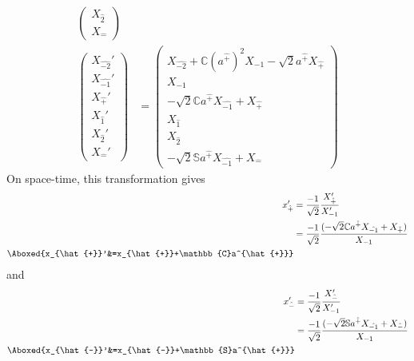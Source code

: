 \documentclass[]{article}
\numberwithin{equation}{section}
\begin{document}
{{\begin{align}
\begin{pmatrix}
    {X}_{\hat{2}}\\
    {X}_{\hat{-}}
    \end{pmatrix}\\
    \begin{pmatrix}
    {X}_{\hat{-2}}'\\
    {X}_{\hat{-1}}'\\
    {X}_{\hat{+}}'\\
    {X}_{\hat{1}}'\\
    {X}_{\hat{2}}'\\
    {X}_{\hat{-}}'
    \end{pmatrix}&= \begin{pmatrix}
    {X}_{\hat{-2}}+\mathbb{C}(a^{\hat{+}})^2{X}_{-1}-\sqrt{2}a^{\hat{+}}{X}_{\hat{+}}\\
    {X}_{-1}\\
    -\sqrt{2}\mathbb{C}a^{\hat{+}}{X}_{\hat{-1}}+{X}_{\hat{+}}\\
    {X}_{\hat{1}}\\
    {X}_{\hat{2}}\\
    -\sqrt{2}\mathbb{S}a^{\hat{+}}{X}_{\hat{-1}}+{X}_{\hat{-}}
    \end{pmatrix}
\end{align}
On space-time, this transformation gives
\begin{align}
    x_{\hat{+}}'&=\frac{-1}{\sqrt{2}}\frac{{X}_{{\hat{+}}}'}{ {X}_{-1}'}\\
    &=\frac{-1}{\sqrt{2}}\frac{(-\sqrt{2}\mathbb{C}a^{\hat{+}}{X}_{\hat{-1}}+{X}_{\hat{+}})}{{X}_{-1}}\\
    \Aboxed{x_{\hat{+}}'&=x_{\hat{+}}+\mathbb{C}a^{\hat{+}}}
\end{align}
and
\begin{align}
    x_{\hat{-}}'&=\frac{-1}{\sqrt{2}}\frac{{X}_{{\hat{-}}}'}{ {X}_{-1}'}\\
    &=\frac{-1}{\sqrt{2}}\frac{(-\sqrt{2}\mathbb{S}a^{\hat{+}}{X}_{\hat{-1}}+{X}_{\hat{-}})}{{X}_{-1}}\\
    \Aboxed{x_{\hat{-}}'&=x_{\hat{-}}+\mathbb{S}a^{\hat{+}}}
\end{align}
}}
\end{document}
